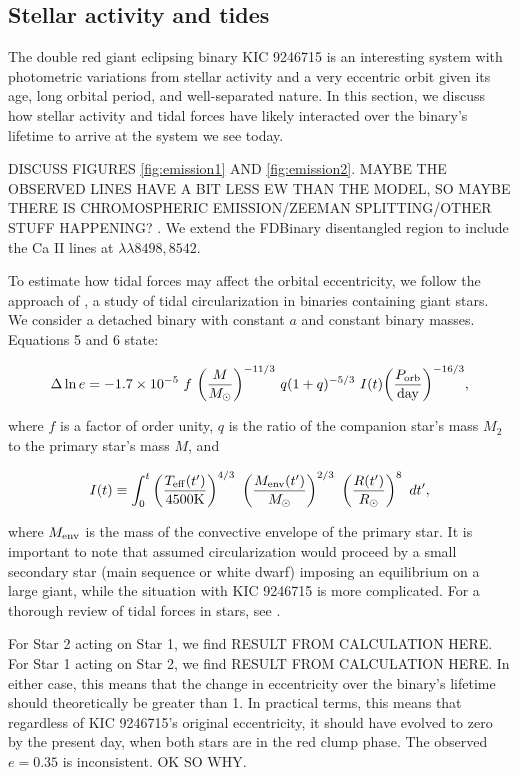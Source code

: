 \subsection{Stellar activity and tides}\label{context}
The double red giant eclipsing binary KIC 9246715 is an interesting system with photometric variations from stellar activity and a very eccentric orbit given its age, long orbital period, and well-separated nature. In this section, we discuss how stellar activity and tidal forces have likely interacted over the binary's lifetime to arrive at the system we see today.

DISCUSS FIGURES \ref{fig:emission1} AND \ref{fig:emission2}. MAYBE THE OBSERVED LINES HAVE A BIT LESS EW THAN THE MODEL, SO MAYBE THERE IS CHROMOSPHERIC EMISSION/ZEEMAN SPLITTING/OTHER STUFF HAPPENING? \citep{har73,fro12}. We extend the FDBinary disentangled region to include the Ca II lines at $\lambda\lambda 8498,8542$.

To estimate how tidal forces may affect the orbital eccentricity, we follow the approach of \citet{ver95}, a study of tidal circularization in binaries containing giant stars. We consider a detached binary with constant $a$ and constant binary masses. Equations 5 and 6 \citep{ver95} state:

\begin{equation}\label{tide1}
\Delta \ln e = -1.7 \times 10^{-5} \ f \ {\left( \frac{M}{M_{\odot}} \right)}^{-11/3} \ q(1+q)^{-5/3} \ I(t) {\left( \frac{P_{\rm{orb}}}{\rm{day}} \right)}^{-16/3},
\end{equation}

where $f$ is a factor of order unity, $q$ is the ratio of the companion star's mass $M_2$ to the primary star's mass $M$, and

\begin{equation}
I(t) \equiv \int_0^t \left( \frac{T_{\rm{eff}}(t')}{4500 \rm{K}} \right)^{4/3} \ \left( \frac{M_{\rm{env}}(t')}{M_{\odot}} \right)^{2/3} \ \left( \frac{R(t')}{R_{\odot}} \right)^8 \ dt',
\end{equation}

where $M_{\rm{env}}$ is the mass of the convective envelope of the primary star. It is important to note that \citet{ver95} assumed circularization would proceed by a small secondary star (main sequence or white dwarf) imposing an equilibrium on a large giant, while the situation with KIC 9246715 is more complicated. For a thorough review of tidal forces in stars, see \citet{ogi14}.

For Star 2 acting on Star 1, we find RESULT FROM CALCULATION HERE. For Star 1 acting on Star 2, we find RESULT FROM CALCULATION HERE. In either case, this means that the change in eccentricity over the binary's lifetime should theoretically be greater than 1. In practical terms, this means that regardless of KIC 9246715's original eccentricity, it should have evolved to zero by the present day, when both stars are in the red clump phase. The observed $e = 0.35$ is inconsistent. OK SO WHY.

